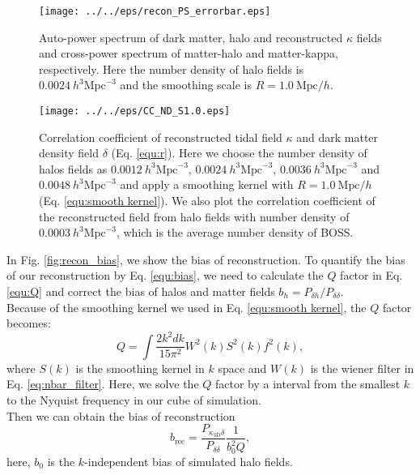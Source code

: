 \begin{figure}[tbp]
\begin{center}
\texttt{[image: ../../eps/recon\_PS\_errorbar.eps]}
\end{center}
\caption{Auto-power spectrum of dark matter, halo and reconstructed $\kappa$ 
fields and cross-power spectrum of matter-halo and matter-kappa, 
respectively. Here the  number density of halo fields is 
$0.0024\ h^{3}\mathrm{Mpc}^{-3}$ and the smoothing scale is
 $R=1.0\ \mathrm{Mpc}/h$.}
\label{fig:recon_PS}
\end{figure}
\begin{figure}[tbp]
\begin{center}
\texttt{[image: ../../eps/CC\_ND\_S1.0.eps]}
\end{center}
\caption{Correlation coefficient of reconstructed tidal field $\kappa$
and dark matter density field $\delta$ (Eq. \eqref{equ:r}). 
Here we choose the number density 
of halos fields as
 $0.0012\ h^{3}\mathrm{Mpc}^{-3}$, $0.0024\ h^{3}\mathrm{Mpc}^{-3}$, 
$0.0036\ h^{3}\mathrm{Mpc}^{-3}$ and $0.0048\ h^{3}\mathrm{Mpc}^{-3}$ 
and apply
a smoothing kernel with $R=1.0\ \mathrm{Mpc}/h$ 
(Eq. \eqref{equ:smooth kernel}).
We also plot the correlation coefficient of the reconstructed field
from halo fields with number density of $0.0003\ h^{3}\mathrm{Mpc}^{-3}$,
 which is 
the average number density of BOSS.}
\label{fig:recon_CC}
\end{figure}
In Fig. \ref{fig:recon_bias}, we show the bias of reconstruction.
To quantify the bias of our reconstruction by Eq. \eqref{equ:bias}, we need
to calculate the $Q$ factor in Eq. \eqref{equ:Q} and correct the bias of 
halos and matter fields $b_h=P_{\delta h}/P_{\delta \delta}$.\\%

Because of the smoothing kernel we used in Eq. \eqref{equ:smooth kernel}, 
the $Q$ factor becomes:
\begin{equation}
Q=\int \frac{2k^{2}dk}{15\pi^{2}}W^{2}(k)S^2(k)f^{2}(k),
\label{equ:Q2}
\end{equation}
where $S(k)$ is the smoothing kernel in $k$ space and $W(k)$ is the 
wiener filter in Eq. \eqref{eq:nbar_filter}. Here, we solve the $Q$ factor
by a interval from the smallest $k$ to the Nyquist frequency  
in our cube of simulation.\\
Then we can obtain the bias of reconstruction
\begin{equation}
b_{\mathrm{rec}}=\frac{P_{\kappa_{\mathrm{3D}}\delta}}{P_{\delta \delta}} 
\frac{1}{b_{0}^{2}Q},
\label{equ:b_recon}
\end{equation}
here, $b_{0}$ is the $k$-independent bias of simulated halo fields. \\

